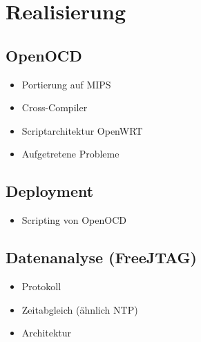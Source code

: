 \chapter{Realisierung}
\section{OpenOCD}
\begin{itemize}
  \item Portierung auf MIPS 
  \item Cross-Compiler
  \item Scriptarchitektur OpenWRT
  \item Aufgetretene Probleme
\end{itemize}
\section{Deployment}
\begin{itemize}
  \item Scripting von OpenOCD
\end{itemize}
\section{Datenanalyse (FreeJTAG)}
\begin{itemize}
  \item Protokoll
  \item Zeitabgleich (ähnlich NTP)
  \item Architektur
\end{itemize}
\lipsum